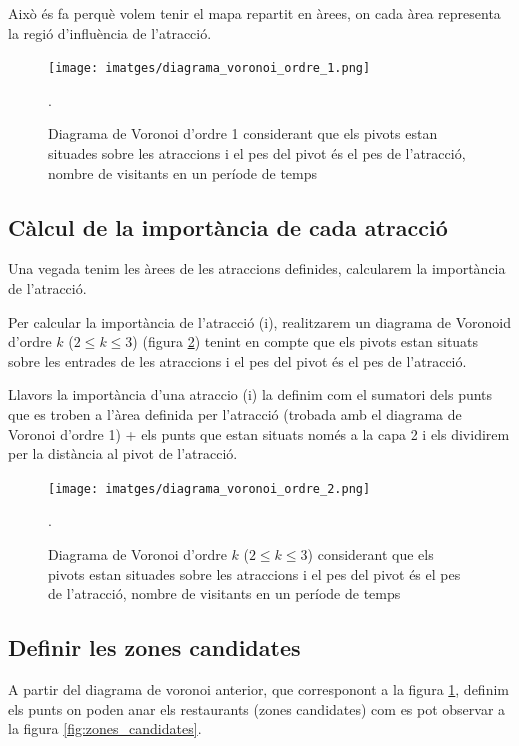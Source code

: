 \documentclass[12pt]{article}
\begin{document}
Això és fa perquè volem tenir el mapa repartit en àrees, on cada àrea representa la regió d’influència de l’atracció. 

\begin{figure}[h!]
	\centering
	\texttt{[image: imatges/diagrama\_voronoi\_ordre\_1.png]}\par\vspace{1cm}
	\caption{Diagrama de Voronoi d'ordre 1 considerant que els pivots estan situades sobre les atraccions i el pes del pivot és el pes de l'atracció, nombre de visitants en un període de temps}.
	\label{fig:diagrama_voronoi_ordre_1}
\end{figure}

\subsection{Càlcul de la importància de cada atracció}
Una vegada tenim les àrees de les atraccions definides, calcularem la importància de l’atracció.

Per calcular la importància de l'atracció (i), realitzarem un diagrama de Voronoid d'ordre $k$ ($2 \le k \le 3$) (figura \ref{fig:diagrama_voronoi_ordre_2}) tenint en compte que els pivots estan situats sobre les entrades de les atraccions i el pes del pivot és el pes de l’atracció. 

Llavors la importància d'una atraccio (i) la definim com el sumatori dels punts que es troben a l'àrea definida per l’atracció (trobada amb el diagrama de Voronoi d'ordre 1) + els punts que estan situats només a la capa 2 i els dividirem per la distància al pivot de l'atracció.

\begin{figure}[h!]
	\centering
	\texttt{[image: imatges/diagrama\_voronoi\_ordre\_2.png]}\par\vspace{1cm}
	\caption{Diagrama de Voronoi d'ordre $k$ ($2 \le k \le 3$) considerant que els pivots estan situades sobre les atraccions i el pes del pivot és el pes de l'atracció, nombre de visitants en un període de temps}.
	\label{fig:diagrama_voronoi_ordre_2}
\end{figure}

\subsection{Definir les zones candidates}
A partir del diagrama de voronoi anterior, que corresponont a la figura \ref{fig:diagrama_voronoi_ordre_1}, definim els punts on poden anar els restaurants (zones candidates) com es pot observar a la figura \ref{fig:zones_candidates}.
\end{document}

